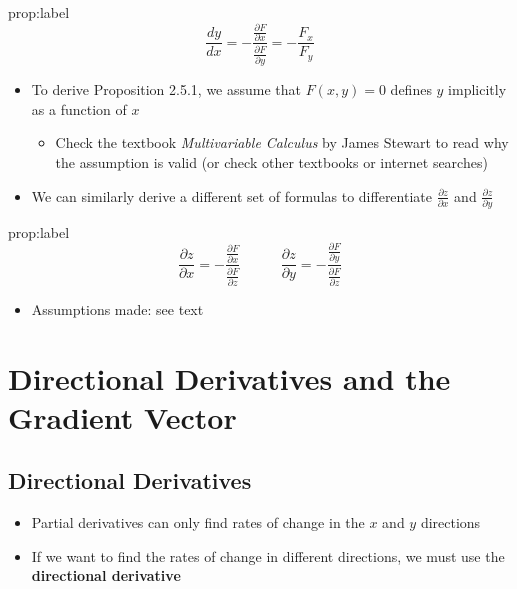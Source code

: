 \documentclass{package/notes}
\begin{document}
\begin{proposition}{prop:label}
	$$\frac{dy}{dx}=-\frac{\frac{\partial F}{\partial x}}{\frac{\partial F}{\partial y}}=-\frac{F_x}{F_y}$$
\end{proposition}

\begin{itemize}
	\item To derive Proposition 2.5.1, we assume that $F(x,y) = 0$ defines $y$ implicitly as a function of $x$
	\begin{itemize}
		\item Check the textbook \textit{Multivariable Calculus} by James Stewart to read why the assumption is valid (or check other textbooks or internet searches)
	\end{itemize}
	\item We can similarly derive a different set of formulas to differentiate $\frac{\partial z}{\partial x}$ and $\frac{\partial z}{\partial y}$ 
\end{itemize}

\newpage
\begin{proposition}{prop:label}
	$$\frac{\partial z}{\partial x}=-\frac{\frac{\partial F}{\partial x}}{\frac{\partial F}{\partial z}}\:\:\:\:\:\:\:\:\:\:\:\:\:
	\frac{\partial z}{\partial y}=-\frac{\frac{\partial F}{\partial y}}{\frac{\partial F}{\partial z}}$$
\end{proposition}

\begin{itemize}
	\item Assumptions made: see text 
\end{itemize}



\section{Directional Derivatives and the Gradient Vector}


\subsection{Directional Derivatives}

\begin{itemize}
	\item Partial derivatives can only find rates of change in the $x$ and $y$ directions
	\item If we want to find the rates of change in different directions, we must use the \textbf{directional derivative}
\end{itemize}
\end{document}
